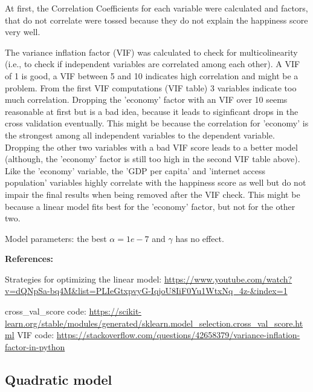 \documentclass[11pt]{article}
\begin{document}
    At first, the Correlation Coefficients for each variable were calculated
and factors, that do not correlate were tossed because they do not
explain the happiness score very well.\newline

The variance inflation factor (VIF) was calculated to check for
multicolinearity (i.e., to check if independent variables are correlated
among each other). A VIF of 1 is good, a VIF between 5 and 10 indicates
high correlation and might be a problem. From the first VIF computations
(VIF table) 3 variables indicate too much correlation.\newline
Dropping the 'economy' factor with an VIF over 10 seems reasonable at
first but is a bad idea, because it leads to siginficant drops in the
cross validation eventually. This might be because the correlation for
'economy' is the strongest among all independent variables to the
dependent variable. Dropping the other two variables with a bad VIF
score leads to a better model (although, the 'economy' factor is still
too high in the second VIF table above). Like the 'economy' variable,
the 'GDP per capita' and 'internet access population' variables highly
correlate with the happiness score as well but do not impair the final
results when being removed after the VIF check. This might be because a
linear model fits best for the 'economy' factor, but not for the other
two.\newline

Model parameters: the best \(\alpha = 1e-7\) and \(\gamma\) has no
effect.\newline

\textbf{References:}\newline

Strategies for optimizing the linear model:\newline
\url{https://www.youtube.com/watch?v=dQNpSa-bq4M&list=PLIeGtxpvyG-IqjoU8IiF0Yu1WtxNq_4z-&index=1}\newline

cross\_val\_score code:\newline
\url{https://scikit-learn.org/stable/modules/generated/sklearn.model_selection.cross_val_score.html}\newline
VIF code:\newline
\url{https://stackoverflow.com/questions/42658379/variance-inflation-factor-in-python}\newline

    \subsection{Quadratic model}\label{quadratic-model}
\end{document}
